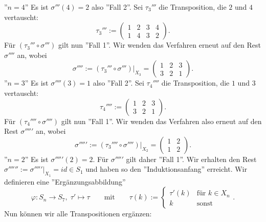 \documentclass{article}
\begin{document}
''$n=4$''
Es ist
$\sigma'''(4) = 2$
also ''Fall 2''.
Sei
$\tau_3'''$
die Transposition,
die $2$ und $4$ vertauscht:
\[
  \tau_3''' := \begin{pmatrix}
    1 & 2 & 3 & 4 \\
    1 & 4 & 3 & 2
  \end{pmatrix}.
\]
Für
$(\tau_3''' \circ \sigma''')$
gilt nun ''Fall 1''.
Wir wenden das Verfahren erneut auf den Rest
$\sigma''''$ an, wobei
\[
  \sigma'''' := (\tau_3''' \circ \sigma''')|_{X_3} = \begin{pmatrix}
    1 & 2 & 3 \\
    3 & 2 & 1
  \end{pmatrix}.
\]
''$n=3$''
Es ist
$\sigma''''(3) = 1$
also ''Fall 2''.
Sei
$\tau_4''''$
die Transposition,
die $1$ und $3$ vertauscht:
\[
  \tau_4'''' := \begin{pmatrix}
    1 & 2 & 3 \\
    3 & 2 & 1
  \end{pmatrix}.
\]
Für
$(\tau_4'''' \circ \sigma'''')$
gilt nun ''Fall 1''.
Wir wenden das Verfahren also erneut auf den Rest
$\sigma'''''$ an, wobei
\[
  \sigma''''' := (\tau_3'''' \circ \sigma'''')|_{X_2} = \begin{pmatrix}
    1 & 2 \\
    1 & 2
  \end{pmatrix}.
\]
''$n=2$'' Es ist
$\sigma'''''(2) = 2$.
Für
$\sigma'''''$
gilt daher ''Fall 1''.
Wir erhalten den Rest
$\sigma'''''' := \sigma'''''|_{X_1} = id \in S_1$
und haben so den ''Induktionsanfang'' erreicht.
\newpage
Wir definieren eine ''Ergänzungsabbildung''
\[
  \varphi : S_n \to S_7, \; \tau' \mapsto \tau
  \qquad \text{mit} \qquad
  \tau(k) :=
  \begin{cases*}
    \tau'(k) & \text{für $k \in X_n$} \\
    k        & \text{sonst}
  \end{cases*}.
\]
Nun können wir alle Transpositionen ergänzen:
\end{document}

